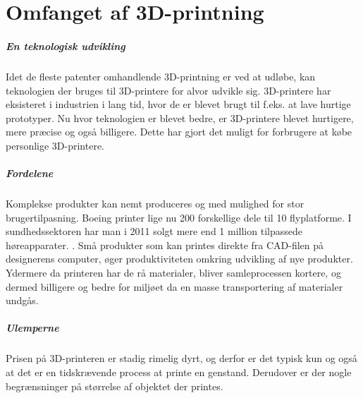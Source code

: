 \chapter{Omfanget af 3D-printning} %
\label{cha:omfanget_af_3d_printer}

\paragraph{En teknologisk udvikling} %
\label{par:en_teknologisk_udvikling}



Idet de fleste patenter omhandlende 3D-printning er ved at udløbe, kan teknologien der bruges til 3D-printere for alvor udvikle sig. 3D-printere har eksisteret i industrien i lang tid, hvor de er blevet brugt til f.eks. at lave hurtige prototyper. Nu hvor teknologien er blevet bedre, er 3D-printere blevet hurtigere, mere præcise og også billigere. Dette har gjort det muligt for forbrugere at købe personlige 3D-printere. 


\paragraph{Fordelene} %
\label{par:fordelene}


Komplekse produkter kan nemt produceres og med mulighed for stor brugertilpasning. Boeing printer lige nu 200 forskellige dele til 10 flyplatforme. I sundhedssektoren har man i 2011 solgt mere end 1 million tilpassede høreapparater. \cite{manyika_disruptive_2013}. Små produkter som kan printes direkte fra CAD-filen på designerens computer, øger produktiviteten omkring udvikling af nye produkter. Ydermere da printeren har de rå materialer, bliver samleprocessen kortere, og dermed billigere og bedre for miljøet da en masse transportering af materialer undgås.


\paragraph{Ulemperne} %
\label{par:ulemperne}


Prisen på 3D-printeren er stadig rimelig dyrt, og derfor er det typisk kun  og også at det er en tidskrævende process at printe en genstand. Derudover er der nogle begrænsninger på størrelse af objektet der printes.



